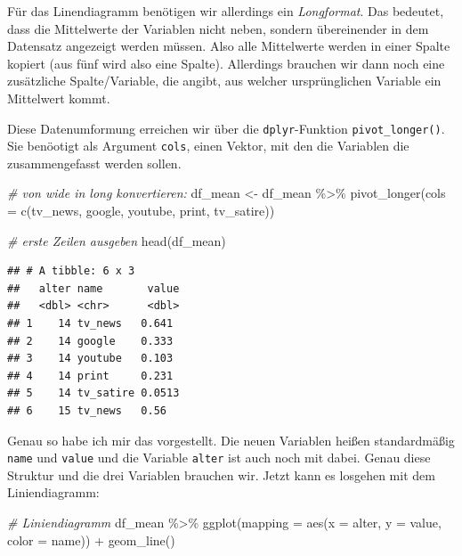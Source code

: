 \documentclass[
]{book}
\newenvironment{Shaded}{\begin{snugshade}}{\end{snugshade}}
\newcommand{\AttributeTok}[1]{\textcolor[rgb]{0.77,0.63,0.00}{#1}}
\newcommand{\CommentTok}[1]{\textcolor[rgb]{0.56,0.35,0.01}{\textit{#1}}}
\newcommand{\FunctionTok}[1]{\textcolor[rgb]{0.00,0.00,0.00}{#1}}
\newcommand{\NormalTok}[1]{#1}
\newcommand{\OtherTok}[1]{\textcolor[rgb]{0.56,0.35,0.01}{#1}}
\newcommand{\SpecialCharTok}[1]{\textcolor[rgb]{0.00,0.00,0.00}{#1}}
\begin{document}
Für das Linendiagramm benötigen wir allerdings ein \emph{Longformat}. Das bedeutet, dass die Mittelwerte der Variablen nicht neben, sondern übereinender in dem Datensatz angezeigt werden müssen. Also alle Mittelwerte werden in einer Spalte kopiert (aus fünf wird also eine Spalte). Allerdings brauchen wir dann noch eine zusätzliche Spalte/Variable, die angibt, aus welcher ursprünglichen Variable ein Mittelwert kommt.

Diese Datenumformung erreichen wir über die \texttt{dplyr}-Funktion \texttt{pivot\_longer()}. Sie benöotigt als Argument \texttt{cols}, einen Vektor, mit den die Variablen die zusammengefasst werden sollen.

\begin{Shaded}
\begin{Highlighting}[]
\CommentTok{\# von wide in long konvertieren:}
\NormalTok{df\_mean }\OtherTok{\textless{}{-}}\NormalTok{ df\_mean }\SpecialCharTok{\%\textgreater{}\%} 
  \FunctionTok{pivot\_longer}\NormalTok{(}\AttributeTok{cols =} \FunctionTok{c}\NormalTok{(tv\_news, google, youtube, print, tv\_satire))}

\CommentTok{\# erste Zeilen ausgeben}
\FunctionTok{head}\NormalTok{(df\_mean)}
\end{Highlighting}
\end{Shaded}

\begin{verbatim}
## # A tibble: 6 x 3
##   alter name       value
##   <dbl> <chr>      <dbl>
## 1    14 tv_news   0.641 
## 2    14 google    0.333 
## 3    14 youtube   0.103 
## 4    14 print     0.231 
## 5    14 tv_satire 0.0513
## 6    15 tv_news   0.56
\end{verbatim}

Genau so habe ich mir das vorgestellt. Die neuen Variablen heißen standardmäßig \texttt{name} und \texttt{value} und die Variable \texttt{alter} ist auch noch mit dabei. Genau diese Struktur und die drei Variablen brauchen wir. Jetzt kann es losgehen mit dem Liniendiagramm:

\begin{Shaded}
\begin{Highlighting}[]
\CommentTok{\# Liniendiagramm}
\NormalTok{df\_mean }\SpecialCharTok{\%\textgreater{}\%} 
  \FunctionTok{ggplot}\NormalTok{(}\AttributeTok{mapping =} \FunctionTok{aes}\NormalTok{(}\AttributeTok{x =}\NormalTok{ alter, }\AttributeTok{y =}\NormalTok{ value, }\AttributeTok{color =}\NormalTok{ name)) }\SpecialCharTok{+} 
  \FunctionTok{geom\_line}\NormalTok{()}
\end{Highlighting}
\end{Shaded}
\end{document}
